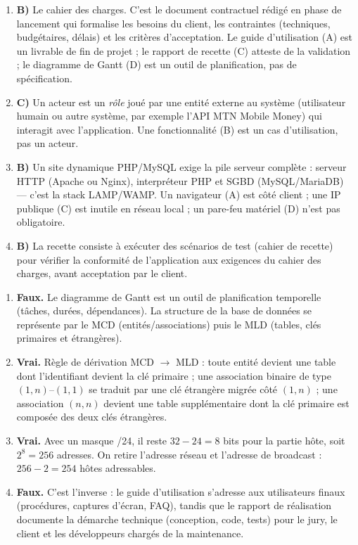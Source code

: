 \documentclass[11pt]{article}
\newcommand{\cle}[1]{{\popxbold\color{popdark}#1}}
\begin{document}
\begin{corrige}
\begin{enumerate}
    \item \textbf{B)} Le cahier des charges. C'est le document contractuel rédigé en phase de lancement qui formalise les besoins du client, les contraintes (techniques, budgétaires, délais) et les critères d'acceptation. Le guide d'utilisation (A) est un livrable de fin de projet ; le rapport de recette (C) atteste de la validation ; le diagramme de Gantt (D) est un outil de planification, pas de spécification.
    \item \textbf{C)} Un acteur est un \emph{rôle} joué par une entité externe au système (utilisateur humain ou autre système, par exemple l'API MTN Mobile Money) qui interagit avec l'application. Une fonctionnalité (B) est un cas d'utilisation, pas un acteur.
    \item \textbf{B)} Un site dynamique PHP/MySQL exige la pile serveur complète : serveur HTTP (Apache ou Nginx), interpréteur PHP et SGBD (MySQL/MariaDB) --- c'est la stack LAMP/WAMP. Un navigateur (A) est côté client ; une IP publique (C) est inutile en réseau local ; un pare-feu matériel (D) n'est pas obligatoire.
    \item \textbf{B)} La recette consiste à exécuter des scénarios de test (cahier de recette) pour vérifier la conformité de l'application aux exigences du cahier des charges, avant acceptation par le client.
\end{enumerate}
\end{corrige}

\begin{corrige}
\begin{enumerate}
    \item \textbf{Faux.} Le diagramme de Gantt est un outil de \cle{planification temporelle} (tâches, durées, dépendances). La structure de la base de données se représente par le \cle{MCD} (entités/associations) puis le \cle{MLD} (tables, clés primaires et étrangères).
    \item \textbf{Vrai.} Règle de dérivation MCD $\to$ MLD : toute entité devient une table dont l'identifiant devient la clé primaire ; une association binaire de type $(1,n)$--$(1,1)$ se traduit par une clé étrangère migrée côté $(1,n)$ ; une association $(n,n)$ devient une table supplémentaire dont la clé primaire est composée des deux clés étrangères.
    \item \textbf{Vrai.} Avec un masque /24, il reste $32-24=8$ bits pour la partie hôte, soit $2^8=256$ adresses. On retire l'adresse réseau et l'adresse de broadcast : $256-2=254$ hôtes adressables.
    \item \textbf{Faux.} C'est l'inverse : le \cle{guide d'utilisation} s'adresse aux utilisateurs finaux (procédures, captures d'écran, FAQ), tandis que le \cle{rapport de réalisation} documente la démarche technique (conception, code, tests) pour le jury, le client et les développeurs chargés de la maintenance.
\end{enumerate}
\end{corrige}
\end{document}
